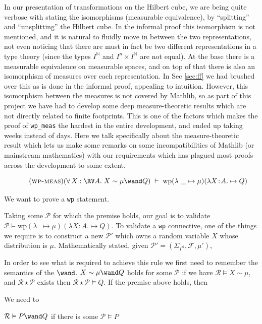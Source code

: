 In our presentation of transformations on the Hilbert cube, we are being quite verbose with stating the isomorphisms (measurable equivalence), by ``splitting'' and ``unsplitting'' the Hilbert cube. In the
informal proof this isomorphism is not mentioned, and it is natural to fluidly move in between the two representations, not even noticing that there are must in 
fact be two different representations in a type theory (since the types $I^\mathbb{N}$ and $I^n \times I^\mathbb{N}$ are not equal). At the base there is a measurable equivalence on measurable spaces,
and on top of that there is also an isomorphism of measures over
each representation. In Sec \ref{sec:ff} we had brushed over this as is done in the informal proof, appealing to intuition. However, this isomorphism between the measures is not covered by
Mathlib, so as part of this project we have had to develop some deep measure-theoretic results which are not directly related to finite footprints.
This is one of the factors which makes the proof of \texttt{wp\_meas} the hardest in the entire development, and ended up taking weeks instead of days. Here we talk specifically about the
measure-theoretic result which lets us make some remarks on some incompatibilities of Mathlib (or mainstream mathematics) with our requirements which has plagued most proofs across the development to some extent.

\[
\tag{\textsc{wp-meas}}
(\forall\, X : \RV A.\; X \sim \mu \wand Q)
\;\vdash\;
\mathrm{wp} (\lambda\ \_ \mapsto \mu) ( \lambda X\!:\!A.\mapsto Q)
\]

We want to prove a \texttt{wp} statement.

Taking some $\mathcal{P}$ for which the premise holds, our goal is to 
validate $\mathcal{P} \vDash \mathrm{wp} (\lambda\ \_ \mapsto \mu) ( \lambda X\!:\!A.\mapsto Q)$.
To validate a \texttt{wp} connective, one of the things we require is to construct a new $\mathcal{P'}$ which owns a random variable $X$ whose distribution
is $\mu$. Mathematically stated, given $\mathcal{P'} = (\Sigma_{I^\mathbb{N}}, \mathcal{F}, \mu')$, 

In order to see what is required to achieve this rule we first need to remember
the semantics of the $\wand$. 
$X \sim \mu \wand Q$ holds for some $\mathcal{P}$ if we have $\mathcal{R} \vDash X \sim \mu$, and $\mathcal{R} \star \mathcal{P}$ exists then
$\mathcal{R} \star \mathcal{P} \vDash Q$. If the premise above holds, then 

We need to 

$ \mathcal{R} \vDash P \wand Q$ if there is some $\mathcal{P} \vDash P$

